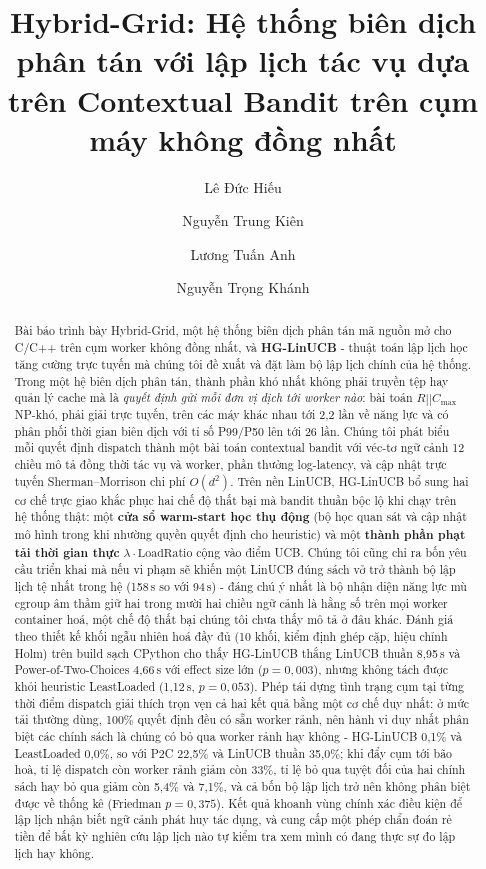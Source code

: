 \documentclass[final,5p,times,twocolumn]{elsarticle}
\begin{document}
\begin{frontmatter}

\title{Hybrid-Grid: Hệ thống biên dịch phân tán với lập lịch tác vụ dựa trên Contextual Bandit trên cụm máy không đồng nhất}

\author[a]{Lê Đức Hiếu}
\author[a]{Nguyễn Trung Kiên}
\author[a]{Lương Tuấn Anh}
\author[a]{Nguyễn Trọng Khánh}

\begin{abstract}
Bài báo trình bày Hybrid-Grid, một hệ thống biên dịch phân tán mã nguồn mở cho C/C++ trên cụm worker không đồng nhất, và \textbf{HG-LinUCB} - thuật toán lập lịch học tăng cường trực tuyến mà chúng tôi đề xuất và đặt làm bộ lập lịch chính của hệ thống. Trong một hệ biên dịch phân tán, thành phần khó nhất không phải truyền tệp hay quản lý cache mà là \emph{quyết định gửi mỗi đơn vị dịch tới worker nào}: bài toán $R||C_{\max}$ NP-khó, phải giải trực tuyến, trên các máy khác nhau tới 2,2 lần về năng lực và có phân phối thời gian biên dịch với tỉ số P99/P50 lên tới 26 lần. Chúng tôi phát biểu mỗi quyết định dispatch thành một bài toán contextual bandit với véc-tơ ngữ cảnh 12 chiều mô tả đồng thời tác vụ và worker, phần thưởng log-latency, và cập nhật trực tuyến Sherman--Morrison chi phí $O(d^2)$. Trên nền LinUCB, HG-LinUCB bổ sung hai cơ chế trực giao khắc phục hai chế độ thất bại mà bandit thuần bộc lộ khi chạy trên hệ thống thật: một \textbf{cửa sổ warm-start học thụ động} (bộ học quan sát và cập nhật mô hình trong khi nhường quyền quyết định cho heuristic) và một \textbf{thành phần phạt tải thời gian thực} $\lambda\cdot\text{LoadRatio}$ cộng vào điểm UCB. Chúng tôi cũng chỉ ra bốn yêu cầu triển khai mà nếu vi phạm sẽ khiến một LinUCB đúng sách vở trở thành bộ lập lịch tệ nhất trong hệ (158\,s so với 94\,s) - đáng chú ý nhất là bộ nhận diện năng lực mù cgroup âm thầm giữ hai trong mười hai chiều ngữ cảnh là hằng số trên mọi worker container hoá, một chế độ thất bại chúng tôi chưa thấy mô tả ở đâu khác. Đánh giá theo thiết kế khối ngẫu nhiên hoá đầy đủ (10 khối, kiểm định ghép cặp, hiệu chỉnh Holm) trên build sạch CPython cho thấy HG-LinUCB thắng LinUCB thuần 8,95\,s và Power-of-Two-Choices 4,66\,s với effect size lớn ($p=0{,}003$), nhưng không tách được khỏi heuristic LeastLoaded (1,12\,s, $p=0{,}053$). Phép tái dựng tình trạng cụm tại từng thời điểm dispatch giải thích trọn vẹn cả hai kết quả bằng một cơ chế duy nhất: ở mức tải thường dùng, 100\% quyết định đều có sẵn worker rảnh, nên hành vi duy nhất phân biệt các chính sách là chúng có bỏ qua worker rảnh hay không - HG-LinUCB 0,1\% và LeastLoaded 0,0\%, so với P2C 22,5\% và LinUCB thuần 35,0\%; khi đẩy cụm tới bão hoà, tỉ lệ dispatch còn worker rảnh giảm còn 33\%, tỉ lệ bỏ qua tuyệt đối của hai chính sách hay bỏ qua giảm còn 5,4\% và 7,1\%, và cả bốn bộ lập lịch trở nên không phân biệt được về thống kê (Friedman $p=0{,}375$). Kết quả khoanh vùng chính xác điều kiện để lập lịch nhận biết ngữ cảnh phát huy tác dụng, và cung cấp một phép chẩn đoán rẻ tiền để bất kỳ nghiên cứu lập lịch nào tự kiểm tra xem mình có đang thực sự đo lập lịch hay không.

\end{abstract}
\end{frontmatter}
\end{document}
